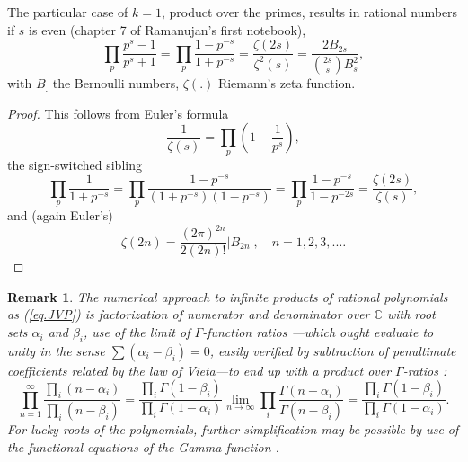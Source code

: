 \documentclass{amsart}
\newtheorem{rem}{Remark}
\begin{document}
The particular case of $k=1$, product over the primes,
results in rational numbers if $s$ is even
(chapter 7 of Ramanujan's first notebook),
\begin{equation}
\prod_p \frac{p^s-1}{p^s+1}
=
\prod_p \frac{1-p^{-s}}{1+p^{-s}}
=
\frac{\zeta(2s)}{\zeta^2(s)}
=
\frac{2B_{2s}}{\binom{2s}{s}B_s^2},
\label{eq.Rama}
\end{equation}
with $B_.$ the Bernoulli numbers, $\zeta(.)$ Riemann's zeta function.
\begin{proof}
This follows from Euler's formula
\begin{equation}
\frac{1}{\zeta(s)}=\prod_p\left(1-\frac{1}{p^s}\right)
,
\label{eq.eul}
\end{equation}
the sign-switched sibling \cite{FrobergBIT8,SebahGourdon}
\begin{equation}
\prod_p \frac{1}{1+p^{-s}}
=
\prod_p \frac{1-p^{-s}}{(1+p^{-s})(1-p^{-s})}
=
\prod_p \frac{1-p^{-s}}{1-p^{-2s}}
=\frac{\zeta(2s)}{\zeta(s)},
\label{eq.zetadoubl}
\end{equation}
and (again Euler's)
\cite[23.2.16]{AS}
\begin{equation}
\zeta(2n)=\frac{(2\pi)^{2n}}{2(2n)!}\left|B_{2n}\right|,\quad n=1,2,3,.\ldots
\end{equation}
\end{proof}
\begin{rem}
The numerical approach to infinite products of rational
polynomials as (\ref{eq.JVP}) is factorization of numerator and denominator
over $\mathbb{C}$ with root sets $\alpha_i$ and $\beta_i$,
use of the limit of $\Gamma$-function ratios \cite[(6.1.47)]{AS}---which
ought evaluate to unity in the sense $\sum (\alpha_i-\beta_i)=0$, easily verified
by subtraction of penultimate coefficients related by the law of Vieta---to end
up with a product over $\Gamma$-ratios \cite[(\S 1.3)]{ErdelyiI}: 
\begin{equation}
\prod_{n=1}^\infty \frac{\prod_i (n-\alpha_i)}{\prod_i (n-\beta_i)}
=
\frac{\prod_i \Gamma(1-\beta_i)}{\prod_i\Gamma(1-\alpha_i)}
\lim_{n\to \infty}
\prod_i
\frac{\Gamma(n-\alpha_i)}{\Gamma(n-\beta_i)}
=
\frac{\prod_i \Gamma(1-\beta_i)}{\prod_i\Gamma(1-\alpha_i)}
.
\label{eq.ntoGamma}
\end{equation}
For lucky roots of the polynomials, further simplification may be possible
by use of the functional equations of the Gamma-function
\cite[(\S 1.2)]{ErdelyiI}\cite{CohenAMS11}.
\end{rem}
\end{document}
